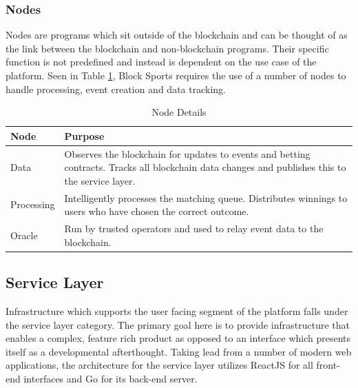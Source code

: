 \documentclass{article}
\begin{document}
		\subsubsection{Nodes} \label{nodes}
Nodes are programs which sit outside of the blockchain and can be thought of as the link between the blockchain and non-blockchain programs. Their specific function is not predefined and instead is dependent on the use case of the platform. Seen in Table \ref{table:nodes}, Block Sports requires the use of a number of nodes to handle processing, event creation and data tracking.

\begin{table}[!htb]
\caption{Node Details}

\begin{tabularx}{\textwidth}{ p{3cm}  p{8.4cm}}
\bfseries{Node} & \bfseries{Purpose} \\
\hline

Data & Observes the blockchain for updates to events and betting contracts. \newline Tracks all blockchain data changes and publishes this to the service layer. \\
\hline

Processing & Intelligently processes the matching queue. \newline Distributes winnings to users who have chosen the correct outcome. \\   \hline

Oracle & Run by trusted operators and used to relay event data to the blockchain. \\

\hline

\end{tabularx}
\label{table:nodes}
\end{table}

	\subsection{Service Layer} \label{service-layer}
Infrastructure which supports the user facing segment of the platform falls under the service layer category. The primary goal here is to provide infrastructure that enables a complex, feature rich product as opposed to an interface which presents itself as a developmental afterthought. Taking lead from a number of modern web applications, the architecture for the service layer utilizes ReactJS for all front-end interfaces and Go for its back-end server.
\end{document}
